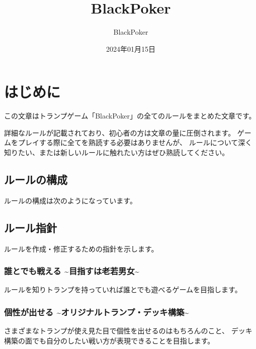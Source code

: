 \documentclass[letterpaper,10pt,dvipdfmx]{sphinxmanual}
\title{BlackPoker}
\date{2024年01月15日}
\author{BlackPoker}
\begin{document}
\pagestyle{empty}
\sphinxmaketitle
\pagestyle{plain}
\sphinxtableofcontents
\pagestyle{normal}
\label{\detokenize{index::doc}}
\ignorespaces 


\sphinxstepscope


\chapter{はじめに}
\label{\detokenize{init/init:id1}}\label{\detokenize{init/init::doc}}
\sphinxAtStartPar
この文章はトランプゲーム「BlackPoker」の全てのルールをまとめた文章です。

\sphinxAtStartPar
詳細なルールが記載されており、初心者の方は文章の量に圧倒されます。
ゲームをプレイする際に全てを熟読する必要はありませんが、
ルールについて深く知りたい、または新しいルールに触れたい方はぜひ熟読してください。


\section{ルールの構成}
\label{\detokenize{init/init:id2}}
\sphinxAtStartPar
ルールの構成は次のようになっています。

\noindent{}


\section{ルール指針}
\label{\detokenize{init/init:id3}}
\sphinxAtStartPar
ルールを作成・修正するための指針を示します。


\subsection{誰とでも戦える \textasciitilde{}目指すは老若男女\textasciitilde{}}
\label{\detokenize{init/init:id4}}
\sphinxAtStartPar
ルールを知りトランプを持っていれば誰とでも遊べるゲームを目指します。


\subsection{個性が出せる \textasciitilde{}オリジナルトランプ・デッキ構築\textasciitilde{}}
\label{\detokenize{init/init:id5}}
\sphinxAtStartPar
さまざまなトランプが使え見た目で個性を出せるのはもちろんのこと、
デッキ構築の面でも自分のしたい戦い方が表現できることを目指します。
\end{document}
